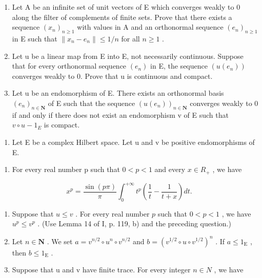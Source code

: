 \begin{enumerate}
\def\labelenumi{\alph{enumi})}
\item
  Let A be an infinite set of unit vectors of E which converges weakly to 0 along the filter of complements of finite sets. Prove that there exists a sequence \((x_{n})_{n\geqslant1}\) with values in A and an orthonormal sequence \((e_{n})_{n\geqslant1}\) in E such that \(\|x_{n}-e_{n}\|\leqslant1/n\) for all \(n\geqslant1\) .
\item
  Let u be a linear map from E into E, not necessarily continuous. Suppose that for every orthonormal sequence \((e_{n})\) in E, the sequence \((u(e_{n}))\) converges weakly to 0. Prove that u is continuous and compact.
\item
  Let u be an endomorphism of E. There exists an orthonormal basis \((e_{n})_{n\in\mathbf{N}}\) of E such that the sequence \((u(e_{n}))_{n\in\mathbf{N}}\) converges weakly to 0 if and only if there does not exist an endomorphism v of E such that \(v\circ u-1_{E}\) is compact.
\end{enumerate}

\begin{enumerate}
\def\labelenumi{\arabic{enumi})}
\setcounter{enumi}{21}
\tightlist
\item
  Let E be a complex Hilbert space. Let u and v be positive endomorphisms of E.
\end{enumerate}

\begin{enumerate}
\def\labelenumi{\alph{enumi})}
\tightlist
\item
  For every real number p such that \(0 < p < 1\) and every \(x \in R_{+}\) , we have
\end{enumerate}

\[
x ^ {p} = \frac {\sin (p \pi)}{\pi} \int_ {0} ^ {+ \infty} t ^ {p} \left(\frac {1}{t} - \frac {1}{t + x}\right) d t.
\]

\begin{enumerate}
\def\labelenumi{\alph{enumi})}
\setcounter{enumi}{1}
\item
  Suppose that \(u \leqslant v\) . For every real number \(p\) such that \(0 < p < 1\) , we have \(u^p \leqslant v^p\) . (Use Lemma 14 of I, p. 119, b) and the preceding question.)\\
\item
  Let \(n \in \mathbf{N}\) . We set \(a = v^{n/2} \circ u^n \circ v^{n/2}\) and \(b = (v^{1/2} \circ u \circ v^{1/2})^n\) . If \(a \leqslant 1_{\mathrm{E}}\) , then \(b \leqslant 1_{\mathrm{E}}\) .
\item
  Suppose that u and v have finite trace. For every integer \(n \in N\) , we have
\end{enumerate}

